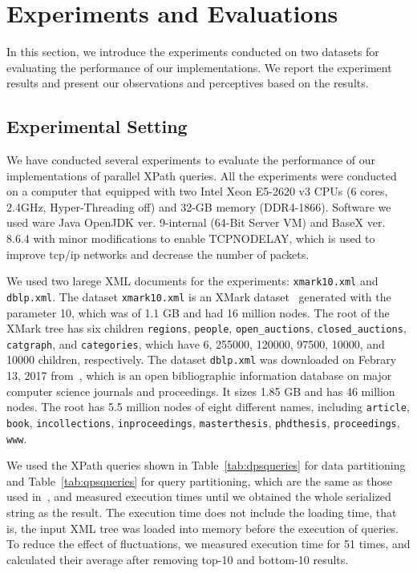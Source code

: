 \def \t#1{t$_#1$}

\section{Experiments and Evaluations}
\label{sect:exper}

In this section, we introduce the experiments conducted on two datasets for
evaluating the performance of our implementations. We report the experiment
results and present our observations and perceptives based on the results.





\subsection{Experimental Setting}

We have conducted several experiments to evaluate the performance of our
implementations of parallel XPath queries. All the experiments were conducted on
a computer that equipped with two Intel Xeon E5-2620 v3 CPUs (6 cores, 2.4GHz,
Hyper-Threading off) and 32-GB memory (DDR4-1866). Software we used ware Java
OpenJDK ver. 9-internal (64-Bit Server VM) and BaseX ver. 8.6.4 with minor
modifications to enable TCP\textunderscore NODELAY, which is
used to improve tcp/ip networks and decrease the number of packets.

We used two larege XML documents for the experiments: \texttt{xmark10.xml} and
\texttt{dblp.xml}. The dataset \texttt{xmark10.xml} is an XMark
dataset~\cite{XMark} generated with the parameter 10, which was of 1.1 GB and
had 16 million nodes. The root of the XMark tree has six children
\verb|regions|, \verb|people|, \verb|open_auctions|, \verb|closed_auctions|,
\verb|catgraph|, and \verb|categories|, which have 6, 255000, 120000, 97500,
10000, and 10000 children, respectively. The dataset \texttt{dblp.xml} was
downloaded on Febrary 13, 2017 from~\cite{DBLP}, which is an open bibliographic
information database on major computer science journals and proceedings. It
sizes 1.85 GB and has 46 million nodes. The root has 5.5 million nodes of eight
different names, including  \texttt{article},  \texttt{book},
\texttt{incollections},  \texttt{inproceedings},  \texttt{masterthesis},
\texttt{phdthesis}, \texttt{proceedings},  \texttt{www}.


We used the XPath queries shown in Table~\ref{tab:dpsqueries} for data
partitioning and Table~\ref{tab:qpsqueries} for query partitioning, which are
the same as those used in~\cite{BoLS09}, and measured execution times until we
obtained the whole serialized string as the result. The execution time does not
include the loading time, that is, the input XML tree was loaded into memory
before the execution of queries. To reduce the effect of fluctuations, we
measured execution time for 51 times, and calculated their average after
removing top-10 and bottom-10 results.


